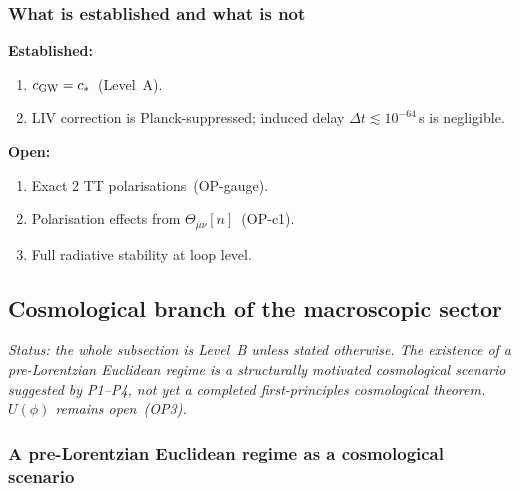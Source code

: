 \documentclass[11pt,a4paper]{article}
\numberwithin{equation}{section}
\begin{document}
\subsubsection*{What is established and what is not}

\textbf{Established:}
\begin{enumerate}[label=(\roman*)]
  \item $c_{\rm GW}=c_*$~(Level~A).
  \item LIV correction is Planck-suppressed; induced delay
    $\Delta t\lesssim10^{-64}$\,s is negligible.
\end{enumerate}

\textbf{Open:}
\begin{enumerate}[label=(\roman*)]
  \item Exact 2 TT polarisations~(OP-gauge).
  \item Polarisation effects from $\Theta_{\mu\nu}[n]$~(OP-c1).
  \item Full radiative stability at loop level.
\end{enumerate}

\subsection{Cosmological branch of the macroscopic sector}
\label{sec:mp_cosmo}

\textit{Status: the whole subsection is Level~B unless stated
otherwise. The existence of a pre-Lorentzian Euclidean regime is a
structurally motivated cosmological scenario suggested by P1--P4, not
yet a completed first-principles cosmological theorem. $U(\phi)$
remains open~(OP3).}

\subsubsection*{A pre-Lorentzian Euclidean regime as a cosmological
scenario}
\end{document}
